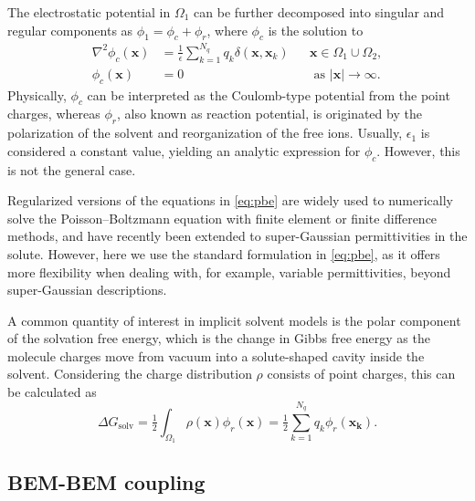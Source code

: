 The electrostatic potential in $\Omega_1$ can be further decomposed into singular and regular components as $\phi_1 = \phi_c + \phi_r$, where $\phi_c$ is the solution to
%
\begin{align}\label{eq:phic}
\nabla^2\phi_c(\mathbf{x}) &= \tfrac{1}{\epsilon}\sum_{k=1}^{N_q}q_k\delta(\mathbf{x},\mathbf{x}_k) &&\mathbf{x}\in\Omega_1\cup\Omega_2,\nonumber\\
\phi_c(\mathbf{x})&=0 &&\text{ as } |\mathbf{x}|\to\infty.
\end{align}
Physically, $\phi_c$ can be interpreted as the Coulomb-type potential from the point charges, whereas $\phi_r$, also known as reaction potential, is originated by the polarization of the solvent and reorganization of the free ions. 
Usually, $\epsilon_1$ is considered a constant value, yielding an analytic expression for $\phi_c$. However, this is not the general case.

Regularized versions of the equations in \eqref{eq:pbe} \cite{LuZhouHolstMcCammon2008, LeeGengZhao2021} are widely used to numerically solve the Poisson--Boltzmann equation with finite element or finite difference methods, and have recently been extended to super-Gaussian permittivities in the solute.\cite{wang2022regularization} However, here we use the standard formulation in \eqref{eq:pbe}, as it offers more flexibility when dealing with, for example, variable permittivities, beyond super-Gaussian descriptions.

A common quantity of interest in implicit solvent models is the polar component of the solvation free energy, which is the change in Gibbs free energy as the molecule charges move from vacuum into a solute-shaped cavity inside the solvent. Considering the charge distribution $\rho$ consists of point charges, this can be calculated as
%
\begin{equation}\label{eq:dG} 
\Delta G_{\text{solv}} = \tfrac{1}{2}\int_{\Omega_1} \rho(\mathbf{x})\phi_{r}(\mathbf{x}) = \tfrac{1}{2}\sum_{k=1}^{N_q} q_k\phi_r(\mathbf{x_k}).
\end{equation}

\subsection*{\sffamily \large BEM-BEM coupling}

